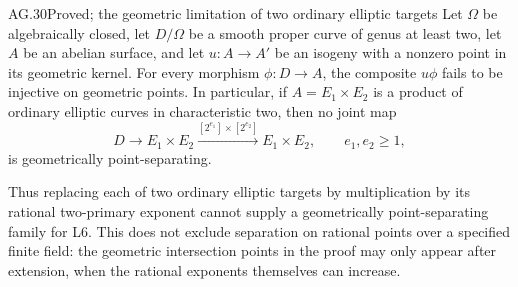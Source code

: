 \begin{claim}{AG.30}{Proved; the geometric limitation of two ordinary elliptic targets}
Let $\Omega$ be algebraically closed, let $D/\Omega$
be a smooth proper curve of genus at least two, let $A$
be an abelian surface, and let $u:A\to A'$ be an isogeny
with a nonzero point in its geometric kernel.
For every morphism $\phi:D\to A$, the composite
$u\phi$ fails to be injective on geometric points.
In particular, if $A=E_1\times E_2$ is a product of
ordinary elliptic curves in characteristic two, then
no joint map
\[
 D\longrightarrow E_1\times E_2
       \xrightarrow{[2^{e_1}]\times[2^{e_2}]}
                    E_1\times E_2,
 \qquad e_1,e_2\ge1,
\]
is geometrically point-separating.

Thus replacing each of two ordinary elliptic targets by
multiplication by its rational two-primary exponent cannot
supply a geometrically point-separating family for L6.
This does not exclude separation on rational points over
a specified finite field: the geometric intersection points
in the proof may only appear after extension, when the
rational exponents themselves can increase.
\end{claim}
